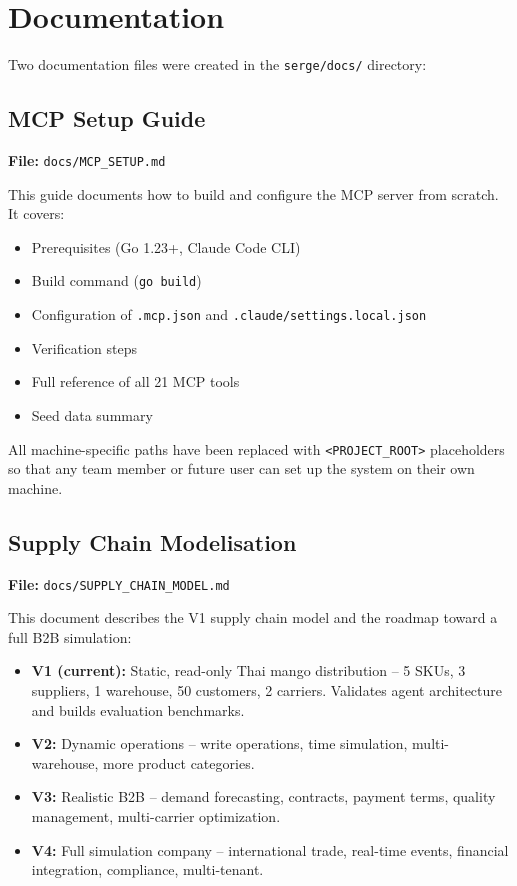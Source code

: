 \documentclass[12pt,a4paper]{report}
\begin{document}
\chapter{Documentation}

Two documentation files were created in the \texttt{serge/docs/} directory:

\section{MCP Setup Guide}

\textbf{File:} \texttt{docs/MCP\_SETUP.md}

This guide documents how to build and configure the MCP server from scratch. It covers:
\begin{itemize}[itemsep=0.2em]
    \item Prerequisites (Go 1.23+, Claude Code CLI)
    \item Build command (\texttt{go build})
    \item Configuration of \texttt{.mcp.json} and \texttt{.claude/settings.local.json}
    \item Verification steps
    \item Full reference of all 21 MCP tools
    \item Seed data summary
\end{itemize}

All machine-specific paths have been replaced with \texttt{<PROJECT\_ROOT>} placeholders so that any team member or future user can set up the system on their own machine.

\section{Supply Chain Modelisation}

\textbf{File:} \texttt{docs/SUPPLY\_CHAIN\_MODEL.md}

This document describes the V1 supply chain model and the roadmap toward a full B2B simulation:
\begin{itemize}[itemsep=0.2em]
    \item \textbf{V1 (current):} Static, read-only Thai mango distribution -- 5 SKUs, 3 suppliers, 1 warehouse, 50 customers, 2 carriers. Validates agent architecture and builds evaluation benchmarks.
    \item \textbf{V2:} Dynamic operations -- write operations, time simulation, multi-warehouse, more product categories.
    \item \textbf{V3:} Realistic B2B -- demand forecasting, contracts, payment terms, quality management, multi-carrier optimization.
    \item \textbf{V4:} Full simulation company -- international trade, real-time events, financial integration, compliance, multi-tenant.
\end{itemize}
\end{document}
